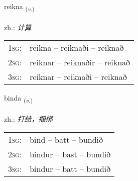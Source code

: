 \documentclass[frontgrid, backgrid]{flacards}\usepackage[]{graphicx}\usepackage[]{xcolor}
\begin{document}
\renewcommand{\blhead}{\vskip5pt {\small\bfseries\footnotesize Sagnorð | 动词 }}
\renewcommand{\bcfoot}{\vskip5pt \hspace{2pt}{\small\bfseries\footnotesize 1K}}


{reikna \small{\textsubscript{(\textit{v.})}} \\[1ex] %
\textphonetic{[reihkna]} \\
zh.: \emph{计算} \\  [2ex]
\renewcommand*{\arraystretch}{0.8}
\begin{tabular}{p{1cm}l}
\textsc{1sg}: & reikna -- reiknaði -- reiknað \\ 
\textsc{2sg}: & reiknar -- reiknaðir -- reiknað \\ 
\textsc{3sg}: & reiknar -- reiknaði -- reiknað \\ 
\end{tabular}
}

\renewcommand{\flhead}{\vskip5pt \fboxsep=0pt {\small\bfseries\footnotesize Sagnorð | 动词}}
\renewcommand{\fcfoot}{\vskip5pt \fboxsep=0pt \hspace{2pt}{\small\bfseries\footnotesize 1K}}

\renewcommand{\blhead}{\vskip5pt {\small\bfseries\footnotesize Sagnorð | 动词 }}
\renewcommand{\bcfoot}{\vskip5pt \hspace{2pt}{\small\bfseries\footnotesize 1K}}


{binda \small{\textsubscript{(\textit{v.})}} \\[1ex] %
\textphonetic{[pɪnta]} \\
zh.: \emph{打结，捆绑} \\  [2ex]
\renewcommand*{\arraystretch}{0.8}
\begin{tabular}{p{1cm}l}
\textsc{1sg}: & bind -- batt -- bundið \\ 
\textsc{2sg}: & bindur -- bast -- bundið \\ 
\textsc{3sg}: & bindur -- batt -- bundið \\ 
\end{tabular}
}
\end{document}
